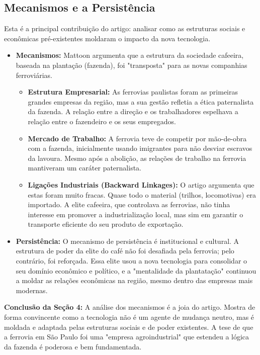 \documentclass[12pt, a4paper]{article}
\begin{document}
\subsection{Mecanismos e a Persistência}
Esta é a principal contribuição do artigo: analisar como as estruturas sociais e econômicas pré-existentes moldaram o impacto da nova tecnologia.
\begin{itemize}
    \item \textbf{Mecanismos:} Mattoon argumenta que a estrutura da sociedade cafeeira, baseada na plantação (fazenda), foi "transposta" para as novas companhias ferroviárias.
        \begin{itemize}
            \item \textbf{Estrutura Empresarial:} As ferrovias paulistas foram as primeiras grandes empresas da região, mas a sua gestão refletia a ética paternalista da fazenda. A relação entre a direção e os trabalhadores espelhava a relação entre o fazendeiro e os seus empregados.
            \item \textbf{Mercado de Trabalho:} A ferrovia teve de competir por mão-de-obra com a fazenda, inicialmente usando imigrantes para não desviar escravos da lavoura. Mesmo após a abolição, as relações de trabalho na ferrovia mantiveram um caráter paternalista.
            \item \textbf{Ligações Industriais (Backward Linkages):} O artigo argumenta que estas foram muito fracas. Quase todo o material (trilhos, locomotivas) era importado. A elite cafeeira, que controlava as ferrovias, não tinha interesse em promover a industrialização local, mas sim em garantir o transporte eficiente do seu produto de exportação.
        \end{itemize}
    \item \textbf{Persistência:} O mecanismo de persistência é institucional e cultural. A estrutura de poder da elite do café não foi desafiada pela ferrovia; pelo contrário, foi reforçada. Essa elite usou a nova tecnologia para consolidar o seu domínio econômico e político, e a "mentalidade da plantatação" continuou a moldar as relações econômicas na região, mesmo dentro das empresas mais modernas.
\end{itemize}

\noindent\textbf{Conclusão da Seção 4:} A análise dos mecanismos é a joia do artigo. Mostra de forma convincente como a tecnologia não é um agente de mudança neutro, mas é moldada e adaptada pelas estruturas sociais e de poder existentes. A tese de que a ferrovia em São Paulo foi uma "empresa agroindustrial" que estendeu a lógica da fazenda é poderosa e bem fundamentada.
\end{document}
